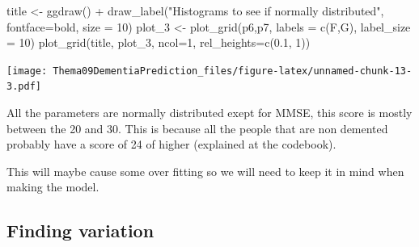 \documentclass[
]{article}
\newenvironment{Shaded}{\begin{snugshade}}{\end{snugshade}}
\newcommand{\AttributeTok}[1]{\textcolor[rgb]{0.77,0.63,0.00}{#1}}
\newcommand{\DecValTok}[1]{\textcolor[rgb]{0.00,0.00,0.81}{#1}}
\newcommand{\FloatTok}[1]{\textcolor[rgb]{0.00,0.00,0.81}{#1}}
\newcommand{\FunctionTok}[1]{\textcolor[rgb]{0.00,0.00,0.00}{#1}}
\newcommand{\NormalTok}[1]{#1}
\newcommand{\OtherTok}[1]{\textcolor[rgb]{0.56,0.35,0.01}{#1}}
\newcommand{\SpecialCharTok}[1]{\textcolor[rgb]{0.00,0.00,0.00}{#1}}
\newcommand{\StringTok}[1]{\textcolor[rgb]{0.31,0.60,0.02}{#1}}
\begin{document}
\begin{Shaded}
\begin{Highlighting}[]
\NormalTok{title }\OtherTok{\textless{}{-}} \FunctionTok{ggdraw}\NormalTok{() }\SpecialCharTok{+} \FunctionTok{draw\_label}\NormalTok{(}\StringTok{"Histograms to see if normally distributed"}\NormalTok{, }\AttributeTok{fontface=}\StringTok{\textquotesingle{}bold\textquotesingle{}}\NormalTok{, }\AttributeTok{size =} \DecValTok{10}\NormalTok{)}
\NormalTok{plot\_3 }\OtherTok{\textless{}{-}} \FunctionTok{plot\_grid}\NormalTok{(p6,p7, }\AttributeTok{labels =} \FunctionTok{c}\NormalTok{(}\StringTok{\textquotesingle{}F\textquotesingle{}}\NormalTok{,}\StringTok{\textquotesingle{}G\textquotesingle{}}\NormalTok{), }\AttributeTok{label\_size =} \DecValTok{10}\NormalTok{)}
\FunctionTok{plot\_grid}\NormalTok{(title, plot\_3, }\AttributeTok{ncol=}\DecValTok{1}\NormalTok{, }\AttributeTok{rel\_heights=}\FunctionTok{c}\NormalTok{(}\FloatTok{0.1}\NormalTok{, }\DecValTok{1}\NormalTok{))}
\end{Highlighting}
\end{Shaded}

\texttt{[image: Thema09DementiaPrediction\_files/figure-latex/unnamed-chunk-13-3.pdf]}

\begin{Shaded}
\end{Shaded}

All the parameters are normally distributed exept for MMSE, this score
is mostly between the 20 and 30. This is because all the people that are
non demented probably have a score of 24 of higher (explained at the
codebook).

This will maybe cause some over fitting so we will need to keep it in
mind when making the model.

\hypertarget{finding-variation}{%
\subsection{Finding variation}\label{finding-variation}}
\end{document}
